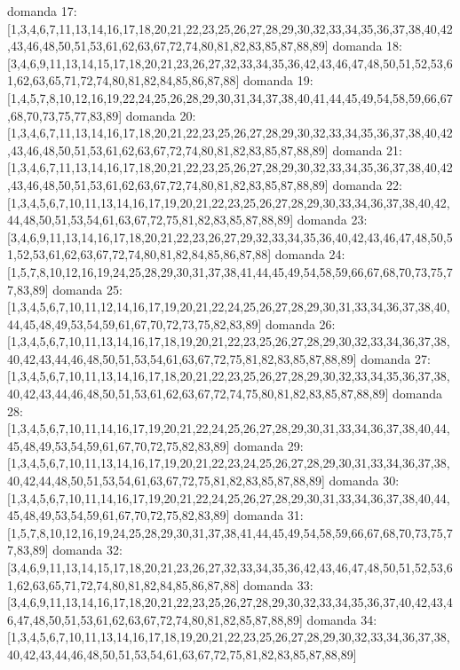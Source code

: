 domanda 17:[1,3,4,6,7,11,13,14,16,17,18,20,21,22,23,25,26,27,28,29,30,32,33,34,35,36,37,38,40,42,43,46,48,50,51,53,61,62,63,67,72,74,80,81,82,83,85,87,88,89]
domanda 18:[3,4,6,9,11,13,14,15,17,18,20,21,23,26,27,32,33,34,35,36,42,43,46,47,48,50,51,52,53,61,62,63,65,71,72,74,80,81,82,84,85,86,87,88]
domanda 19:[1,4,5,7,8,10,12,16,19,22,24,25,26,28,29,30,31,34,37,38,40,41,44,45,49,54,58,59,66,67,68,70,73,75,77,83,89]
domanda 20:[1,3,4,6,7,11,13,14,16,17,18,20,21,22,23,25,26,27,28,29,30,32,33,34,35,36,37,38,40,42,43,46,48,50,51,53,61,62,63,67,72,74,80,81,82,83,85,87,88,89]
domanda 21:[1,3,4,6,7,11,13,14,16,17,18,20,21,22,23,25,26,27,28,29,30,32,33,34,35,36,37,38,40,42,43,46,48,50,51,53,61,62,63,67,72,74,80,81,82,83,85,87,88,89]
domanda 22:[1,3,4,5,6,7,10,11,13,14,16,17,19,20,21,22,23,25,26,27,28,29,30,33,34,36,37,38,40,42,44,48,50,51,53,54,61,63,67,72,75,81,82,83,85,87,88,89]
domanda 23:[3,4,6,9,11,13,14,16,17,18,20,21,22,23,26,27,29,32,33,34,35,36,40,42,43,46,47,48,50,51,52,53,61,62,63,67,72,74,80,81,82,84,85,86,87,88]
domanda 24:[1,5,7,8,10,12,16,19,24,25,28,29,30,31,37,38,41,44,45,49,54,58,59,66,67,68,70,73,75,77,83,89]
domanda 25:[1,3,4,5,6,7,10,11,12,14,16,17,19,20,21,22,24,25,26,27,28,29,30,31,33,34,36,37,38,40,44,45,48,49,53,54,59,61,67,70,72,73,75,82,83,89]
domanda 26:[1,3,4,5,6,7,10,11,13,14,16,17,18,19,20,21,22,23,25,26,27,28,29,30,32,33,34,36,37,38,40,42,43,44,46,48,50,51,53,54,61,63,67,72,75,81,82,83,85,87,88,89]
domanda 27:[1,3,4,5,6,7,10,11,13,14,16,17,18,20,21,22,23,25,26,27,28,29,30,32,33,34,35,36,37,38,40,42,43,44,46,48,50,51,53,61,62,63,67,72,74,75,80,81,82,83,85,87,88,89]
domanda 28:[1,3,4,5,6,7,10,11,14,16,17,19,20,21,22,24,25,26,27,28,29,30,31,33,34,36,37,38,40,44,45,48,49,53,54,59,61,67,70,72,75,82,83,89]
domanda 29:[1,3,4,5,6,7,10,11,13,14,16,17,19,20,21,22,23,24,25,26,27,28,29,30,31,33,34,36,37,38,40,42,44,48,50,51,53,54,61,63,67,72,75,81,82,83,85,87,88,89]
domanda 30:[1,3,4,5,6,7,10,11,14,16,17,19,20,21,22,24,25,26,27,28,29,30,31,33,34,36,37,38,40,44,45,48,49,53,54,59,61,67,70,72,75,82,83,89]
domanda 31:[1,5,7,8,10,12,16,19,24,25,28,29,30,31,37,38,41,44,45,49,54,58,59,66,67,68,70,73,75,77,83,89]
domanda 32:[3,4,6,9,11,13,14,15,17,18,20,21,23,26,27,32,33,34,35,36,42,43,46,47,48,50,51,52,53,61,62,63,65,71,72,74,80,81,82,84,85,86,87,88]
domanda 33:[3,4,6,9,11,13,14,16,17,18,20,21,22,23,25,26,27,28,29,30,32,33,34,35,36,37,40,42,43,46,47,48,50,51,53,61,62,63,67,72,74,80,81,82,85,87,88,89]
domanda 34:[1,3,4,5,6,7,10,11,13,14,16,17,18,19,20,21,22,23,25,26,27,28,29,30,32,33,34,36,37,38,40,42,43,44,46,48,50,51,53,54,61,63,67,72,75,81,82,83,85,87,88,89]
